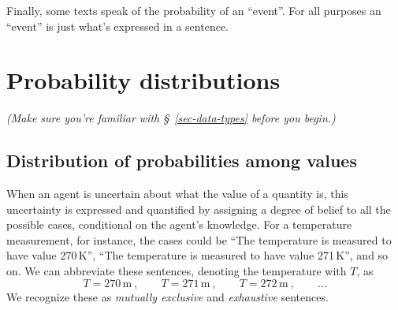\documentclass[
  a4paper,
  DIV=11,
  numbers=noendperiod,
  oneside]{scrreprt}
\begin{document}
Finally, some texts speak of the probability of an ``event''. For all
purposes an ``event'' is just what's expressed in a sentence.

\hypertarget{probability-distributions}{%
\chapter{Probability distributions}\label{probability-distributions}}

\providecommand{\ul}{\uline}
\renewcommand*{\|}[1][]{\nonscript\:#1\vert\nonscript\:\mathopen{}}
\providecommand*{\pr}[1]{\textsf{\small`#1'}}
\renewcommand*{\pr}[1]{\textsf{\small`#1'}}
\providecommand*{\prq}[1]{\textsf{\small #1}}
\renewcommand*{\prq}[1]{\textsf{\small #1}}
\providecommand{\se}[1]{\mathsfit{#1}}
\renewcommand{\se}[1]{\mathsfit{#1}}
\providecommand{\p}{\mathrm{p}}
\renewcommand{\p}{\mathrm{p}}
\renewcommand{\P}{\mathrm{P}}

\providecommand*{\mo}[1][=]{\mathord{\,#1\,}}
\providecommand*{\yX}{\se{X}}
\providecommand*{\yY}{\se{Y}}
\providecommand*{\yI}{\se{I}}

{\emph{(Make sure you're familiar with §~\ref{sec-data-types} before you
begin.)}}

\hypertarget{distribution-of-probabilities-among-values}{%
\section{Distribution of probabilities among
values}\label{distribution-of-probabilities-among-values}}

When an agent is uncertain about what the value of a quantity is, this
uncertainty is expressed and quantified by assigning a degree of belief
to all the possible cases, conditional on the agent's knowledge. For a
temperature measurement, for instance, the cases could be ``{The
temperature is measured to have value 270\,K}'', ``{The temperature is
measured to have value 271\,K}'', and so on. We can abbreviate these
sentences, denoting the temperature with \(T\), as \[
T = 270\,\mathrm{m} \ , \qquad
T = 271\,\mathrm{m} \ , \qquad
T = 272\,\mathrm{m} \ , \qquad
\dotsc
\] We recognize these as \emph{mutually exclusive} and \emph{exhaustive}
sentences.
\end{document}
